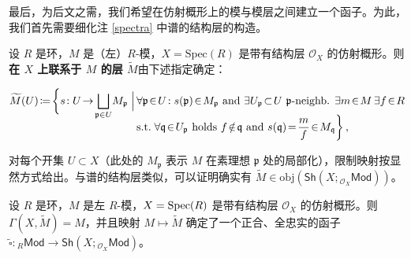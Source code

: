 \begin{equation}
\end{equation}

最后，为后文之需，我们希望在仿射概形上的模与模层之间建立一个函子。为此，我们首先需要细化注 \ref{spectra} 中谱的结构层的构造。

\begin{Def}\label{asssheafofmodules}
设 $R$ 是环，$M$ 是（左）$R$-模，$X=\text{Spec}(R)$ 是带有结构层 $\mathcal{O}_X$ 的仿射概形。则\textbf{在 $X$ 上联系于 $M$ 的层 $\widetilde{M}$}由下述指定确定：
\begin{small}\begin{align*}
		\widetilde{M}(U)\!\coloneqq\!\bigg\{s\!:U\!\rightarrow\!\bigsqcup_{\mathfrak{p}\in U}\! M_\mathfrak{p}\Bigm|\, &\forall\mathfrak{p}\!\in\! U\!: s(\mathfrak{p})\!\in\! M_\mathfrak{p}\text{ and }\exists U_\mathfrak{p}\!\subset\! U\text{ $\mathfrak{p}$-neighb. }\exists m\!\in\! M\,\exists f\!\in\! R \\[-0.3cm]
		&\text{s.t. }\!\forall\mathfrak{q}\!\in\! U_\mathfrak{p}\text{ holds }f\!\notin\!\mathfrak{q} \text{ and }
		s(\mathfrak{q})\!=\! \frac{m}{f}\!\in\! M_\mathfrak{q}\bigg\}\,,
\end{align*}\end{small}
\!\!对每个开集 $U\subset X$（此处的 $M_\mathfrak{p}$ 表示 $M$ 在素理想 $\mathfrak{p}$ 处的局部化），限制映射按显然方式给出。与谱的结构层类似，可以证明确实有 $\widetilde{M}\in\text{obj}(\mathsf{Sh}(X;{}_{\mathcal{O}_X}\!\mathsf{Mod}))$。
\end{Def}

\begin{Pro}\label{squaretildefunc}
设 $R$ 是环，$M$ 是左 $R$-模，$X=\textup{Spec}(R)$ 是带有结构层 $\mathcal{O}_X$ 的仿射概形。则 $\Gamma(X,\widetilde{M})=M$，并且映射 $M\mapsto\widetilde{M}$ 确定了一个正合、全忠实的函子 $\widetilde{\square}: {}_R\mathsf{Mod}\rightarrow \mathsf{Sh}(X;{}_{\mathcal{O}_X}\!\mathsf{Mod})$。
\end{Pro}

